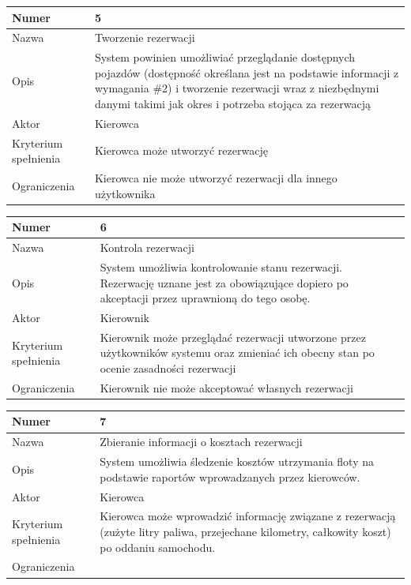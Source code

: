\documentclass[eng,printmode,openany]{mgr}
\begin{document}
	\begin{table}[H]
		\begin{tabularx}{\textwidth}{|l|X|}
			\hline
			Numer                & 5 \\ \hline
			Nazwa                & Tworzenie rezerwacji \\ \hline
			Opis                 & System powinien umożliwiać przeglądanie dostępnych pojazdów (dostępność określana jest na podstawie informacji z wymagania \#2) i tworzenie rezerwacji wraz z niezbędnymi danymi takimi jak okres i potrzeba stojąca za rezerwacją\\ \hline
			Aktor                & Kierowca \\ \hline
			Kryterium spełnienia & Kierowca może utworzyć rezerwację \\ \hline
			Ograniczenia         & Kierowca nie może utworzyć rezerwacji dla innego użytkownika \\ \hline
		\end{tabularx}
	\end{table}
	
	\begin{table}[H]
		\begin{tabularx}{\textwidth}{|l|X|}
			\hline
			Numer                & 6 \\ \hline
			Nazwa                & Kontrola rezerwacji\\ \hline
			Opis                 & System umożliwia kontrolowanie stanu rezerwacji. Rezerwację uznane jest za obowiązujące dopiero po akceptacji przez uprawnioną do tego osobę.\\ \hline
			Aktor                & Kierownik \\ \hline
			Kryterium spełnienia & Kierownik może przeglądać rezerwacji utworzone przez użytkowników systemu oraz zmieniać ich obecny stan po ocenie zasadności rezerwacji \\ \hline
			Ograniczenia         & Kierownik nie może akceptować własnych rezerwacji \\ \hline
		\end{tabularx}
	\end{table}
	
	\begin{table}[H]
		\begin{tabularx}{\textwidth}{|l|X|}
			\hline
			Numer                & 7 \\ \hline
			Nazwa                & Zbieranie informacji o kosztach rezerwacji\\ \hline
			Opis                 & System umożliwia śledzenie kosztów utrzymania floty na podstawie raportów wprowadzanych przez kierowców. \\ \hline
			Aktor                & Kierowca\\ \hline
			Kryterium spełnienia & Kierowca może wprowadzić informację związane z rezerwacją (zużyte litry paliwa, przejechane kilometry, całkowity koszt) po oddaniu samochodu.\\ \hline
			Ograniczenia         & \\ \hline
		\end{tabularx}
	\end{table}
	
\end{document}
